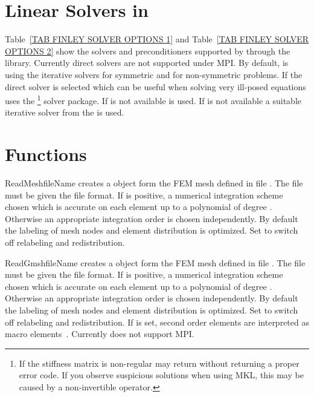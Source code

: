 \section{Linear Solvers in \SolverOptions}
Table~\ref{TAB FINLEY SOLVER OPTIONS 1} and
Table~\ref{TAB FINLEY SOLVER OPTIONS 2} show the solvers and preconditioners supported by
\finley through the \PASO library. Currently direct solvers are not supported under MPI.
By default, \finley is using the iterative solvers \PCG for symmetric and \BiCGStab for non-symmetric problems.
If the direct solver is selected which can be useful when solving very ill-posed equations
\finley uses the \MKL \footnote{If the stiffness matrix is non-regular \MKL may return without
returning a proper error code. If you observe suspicious solutions when using MKL, this may be caused by a non-invertible operator. } solver package. If \MKL is not available \UMFPACK is used. If \UMFPACK is not available
a suitable iterative solver from the \PASO is used.

\section{Functions}
\begin{funcdesc}{ReadMesh}{fileName }
creates a \Domain object form the FEM mesh defined in
file . The file must be given the \finley file format.
If  is positive, a numerical integration scheme
chosen which is accurate on each element up to a polynomial of
degree  . Otherwise
an appropriate integration order is chosen independently.
By default the labeling of mesh nodes and element distribution is
optimized. Set  to switch off relabeling and redistribution.
\end{funcdesc}

\begin{funcdesc}{ReadGmsh}{fileName }
creates a \Domain object form the FEM mesh defined in
file . The file must be given the \gmshextern file format.
If  is positive, a numerical integration scheme
chosen which is accurate on each element up to a polynomial of
degree  . Otherwise
an appropriate integration order is chosen independently.
By default the labeling of mesh nodes and element distribution is
optimized. Set  to switch off relabeling and redistribution.
If  is set, second order elements are interpreted as macro elements~.
Currently  does not support MPI.
\end{funcdesc}


